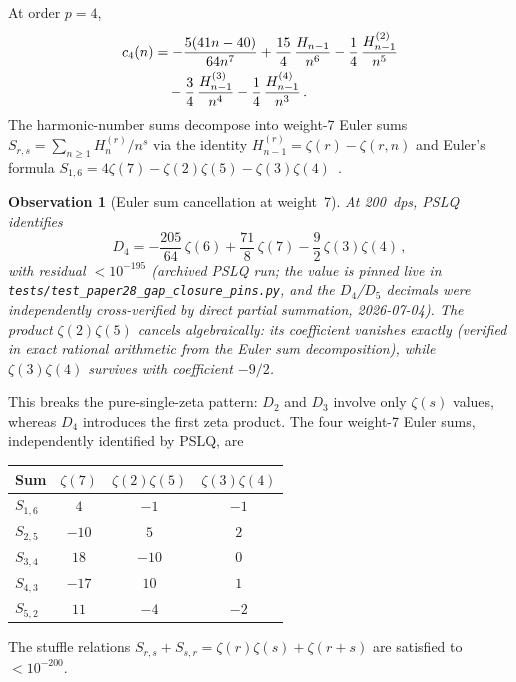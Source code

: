 \documentclass[11pt]{article}
\newtheorem{observation}{Observation}
\begin{document}
At order $p = 4$,
\begin{align}
  c_4(n) &= -\frac{5(41n - 40)}{64n^7}
    + \frac{15}{4}\,\frac{H_{n-1}}{n^6}
    - \frac{1}{4}\,\frac{H_{n-1}^{(2)}}{n^5}
    \notag \\
    &\quad - \frac{3}{4}\,\frac{H_{n-1}^{(3)}}{n^4}
    - \frac{1}{4}\,\frac{H_{n-1}^{(4)}}{n^3}\,.
\end{align}
The harmonic-number sums decompose into weight-7 Euler sums
$S_{r,s} = \sum_{n \ge 1} H_n^{(r)} / n^s$ via the identity
$H_{n-1}^{(r)} = \zeta(r) - \zeta(r,n)$ and Euler's formula
$S_{1,6} = 4\zeta(7) - \zeta(2)\zeta(5) - \zeta(3)\zeta(4)$~\cite{flajolet1998}.

\begin{observation}[Euler sum cancellation at weight~7]
\label{obs:euler_cancel}
At 200~dps, PSLQ identifies
\begin{equation}
\label{eq:D4_decomp}
  D_4 = -\frac{205}{64}\,\zeta(6)
  + \frac{71}{8}\,\zeta(7)
  - \frac{9}{2}\,\zeta(3)\zeta(4)\,,
\end{equation}
with residual $< 10^{-195}$ (archived PSLQ run; the value is pinned
live in \texttt{tests/test\_paper28\_gap\_closure\_pins.py}, and the
$D_4$/$D_5$ decimals were independently cross-verified by direct
partial summation, 2026-07-04).  The product $\zeta(2)\zeta(5)$ cancels
\emph{algebraically}: its coefficient vanishes exactly (verified in
exact rational arithmetic from the Euler sum decomposition), while
$\zeta(3)\zeta(4)$ survives with coefficient $-9/2$.
\end{observation}

This breaks the pure-single-zeta pattern: $D_2$ and $D_3$ involve
only $\zeta(s)$ values, whereas $D_4$ introduces the first zeta
product.  The four weight-7 Euler sums, independently identified by
PSLQ, are
\begin{center}
\begin{tabular}{lccc}
\hline
Sum & $\zeta(7)$ & $\zeta(2)\zeta(5)$ & $\zeta(3)\zeta(4)$ \\
\hline
$S_{1,6}$ & $4$ & $-1$ & $-1$ \\
$S_{2,5}$ & $-10$ & $5$ & $2$ \\
$S_{3,4}$ & $18$ & $-10$ & $0$ \\
$S_{4,3}$ & $-17$ & $10$ & $1$ \\
$S_{5,2}$ & $11$ & $-4$ & $-2$ \\
\hline
\end{tabular}
\end{center}
The stuffle relations $S_{r,s} + S_{s,r} = \zeta(r)\zeta(s) + \zeta(r+s)$
are satisfied to $< 10^{-200}$.
\end{document}
